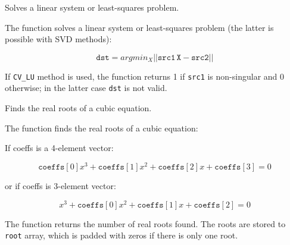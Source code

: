 Solves a linear system or least-squares problem.


\begin{description}
\end{description}

The function solves a linear system or least-squares problem (the latter is possible with SVD methods):

\[
\texttt{dst} = argmin_X||\texttt{src1} \, \texttt{X} - \texttt{src2}||
\]

If \texttt{CV\_LU} method is used, the function returns 1 if \texttt{src1} is non-singular and 0 otherwise; in the latter case \texttt{dst} is not valid.

Finds the real roots of a cubic equation.


\begin{description}
\end{description}

The function finds the real roots of a cubic equation:

If coeffs is a 4-element vector:

\[
\texttt{coeffs}[0] x^3 + \texttt{coeffs}[1] x^2 + \texttt{coeffs}[2] x + \texttt{coeffs}[3] = 0
\]

or if coeffs is 3-element vector:

\[
x^3 + \texttt{coeffs}[0] x^2 + \texttt{coeffs}[1] x + \texttt{coeffs}[2] = 0
\]

The function returns the number of real roots found. The roots are
stored to \texttt{root} array, which is padded with zeros if there is
only one root.

